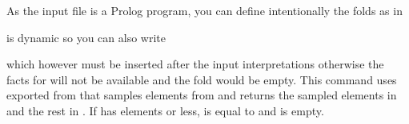 \documentclass[letterpaper,10pt,english]{sphinxmanual}
\begin{document}
\begin{sphinxVerbatim}[commandchars=\\\{\}]
\PYG{p}{[}\PYG{p}{]}
\PYG{p}{[}\PYG{p}{]}
\end{sphinxVerbatim}

As the input file is a Prolog program, you can define intentionally the folds as in

\begin{sphinxVerbatim}[commandchars=\\\{\}]
\end{sphinxVerbatim}

 is dynamic so you can also write

\begin{sphinxVerbatim}[commandchars=\\\{\}]
 
\end{sphinxVerbatim}

which however must be inserted after the input interpretations otherwise the facts for  will not be available and the fold  would be empty.
This command uses  exported from  that samples  elements from  and returns the sampled elements in  and the rest in .
If  has  elements or less,  is equal to  and  is empty.
\end{document}
